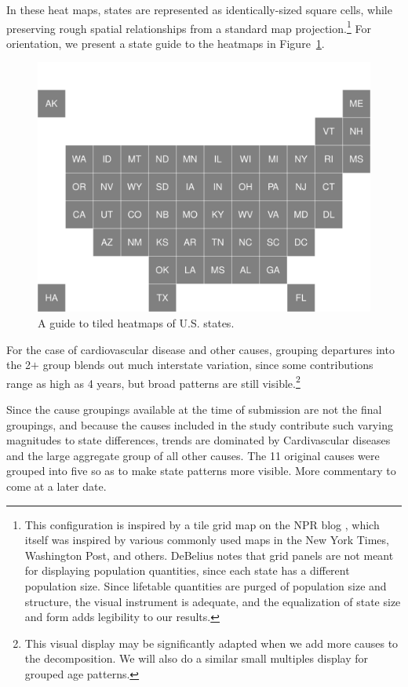 \documentclass[11pt,oneside,a4paper]{article} %
\begin{document}
In these heat maps, states are represented as identically-sized square cells,
while preserving rough spatial relationships from a standard map
projection.\footnote{This configuration is inspired by a tile grid map on the
NPR blog \citep{NPRsquares}, which
itself was inspired by various commonly used maps in the New York Times,
Washington Post, and others. DeBelius notes that grid panels are not meant for
displaying population quantities, since each state has a different population
size. Since lifetable quantities are purged of population size and
structure, the visual instrument is adequate, and the equalization of state
size and form adds legibility to our results.} For orientation, we present a
state guide to the heatmaps in Figure~\ref{fig:heatguide}.
\begin{figure}
\centering
\caption{A guide to tiled heatmaps of U.S. states.}
\label{fig:heatguide}
\includegraphics[scale=.3]{Figures/StatesDiagram.pdf}
\end{figure}


For the case of cardiovascular disease
and other causes, grouping departures into the 2$+$ group blends out much
interstate variation, since some contributions range as high as 4
years, but broad patterns are still visible.\footnote{This visual display may be
significantly adapted when we add more causes to the decomposition. We will also do a similar small multiples
display for grouped age patterns.}

Since the cause groupings available at the time of submission are not the final groupings, and
because the causes included in the study contribute such varying magnitudes to
state differences, trends are dominated by Cardivascular diseases and the large
aggregate group of all other causes. The 11 original causes were grouped into
five so as to make state patterns more visible. More commentary to come at a
later date.
\end{document}
